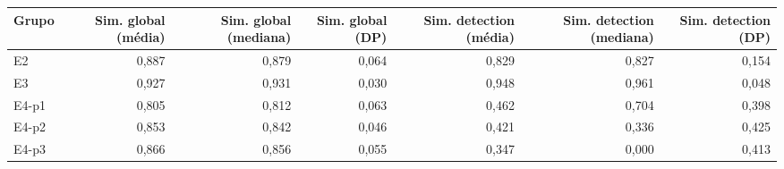 \begin{tabular}{lrrrrrr}
\toprule
Grupo & Sim. global (média) & Sim. global (mediana) & Sim. global (DP) & Sim. detection (média) & Sim. detection (mediana) & Sim. detection (DP) \\
\midrule
E2 & 0,887 & 0,879 & 0,064 & 0,829 & 0,827 & 0,154 \\
E3 & 0,927 & 0,931 & 0,030 & 0,948 & 0,961 & 0,048 \\
E4-p1 & 0,805 & 0,812 & 0,063 & 0,462 & 0,704 & 0,398 \\
E4-p2 & 0,853 & 0,842 & 0,046 & 0,421 & 0,336 & 0,425 \\
E4-p3 & 0,866 & 0,856 & 0,055 & 0,347 & 0,000 & 0,413 \\
\bottomrule
\end{tabular}
